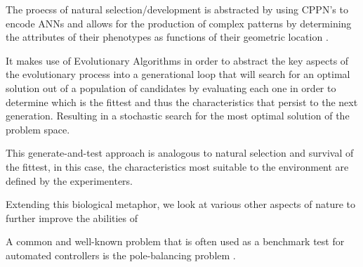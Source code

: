 The proecss of natural selection/development is abstracted by using CPPN's to encode ANNs and allows for the production of complex patterns by determining the attributes of their phenotypes as functions of their geometric location \cite{clune2011performance}.



It makes use of Evolutionary Algorithms in order to abstract the key aspects of the evolutionary process into a generational loop that will search for an optimal solution out of a population of candidates by evaluating each one in order to determine which is the fittest and thus the characteristics that persist to the next generation. Resulting in a stochastic search for the most optimal solution of the problem space.

This generate-and-test approach is analogous to natural selection and survival of the fittest, in this case, the characteristics most suitable to the environment are defined by the experimenters.

Extending this biological metaphor, we look at various other aspects of nature to further improve the abilities of 



A common and well-known problem that is often used as a benchmark test for automated controllers is the pole-balancing problem \cite{Stanley2004}.







